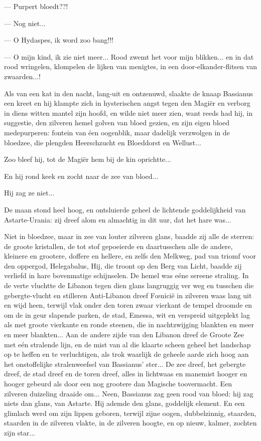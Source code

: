 \documentclass[a4paper, 12pt, oneside, dutch]{article}
\begin{document}
--- Purpert bloedt??!

--- Nog niet...

--- O Hydaspes, ik word zoo bang!!!

--- O mijn kind, ik zie niet meer... Rood zwemt het voor mijn blikken... en in dat rood wringelen, klompelen de lijken van menigtes, in een door-elkander-flitsen van zwaarden...!

Als van een kat in den nacht, lang-uit en ontzenuwd, slaakte de knaap Bassianus een kreet en hij klampte zich in hysterischen angst tegen den Magiër en verborg in diens witten mantel zijn hoofd, en wilde niet meer zien, want reeds had hij, in suggestie, den zilveren hemel golven van bloed gezien, en zijn eigen bloed medepurperen: fontein van éen oogenblik, maar dadelijk verzwolgen in de bloedzee, die plengden Heerschzucht en Bloeddorst en Wellust...

Zoo bleef hij, tot de Magiër hem bij de kin oprichtte...

En hij rond keek en zocht naar de zee van bloed...

Hij zag ze niet...

De maan stond heel hoog, en ontsluierde geheel de lichtende goddelijkheid van Astarte-Urania: zij dreef alom en almachtig in dit uur, dat het hare was...

Niet in bloedzee, maar in zee van louter zilveren glans, baadde zij alle de sterren: de groote kristallen, de tot stof gepoeierde en daartusschen alle de andere, kleinere en grootere, doffere en hellere, en zelfs den Melkweg, pad van triomf voor den oppergod, Helegabalus, Hij, die troont op den Berg van Licht, baadde zij verliefd in hare bovenmatige schijnselen. De hemel was eéne sereene straling. In de verte vluchtte de Libanon tegen dien glans langruggig ver weg en tusschen die gebergte-vlucht en stilleren Anti-Libanon dreef Fœnicië in zilveren waas lang uit en wijd heen, terwijl vlak onder den toren zwaar vierkant de tempel droomde en om de in geur slapende parken, de stad, Emessa, wit en verspreid uitgeplekt lag als met groote vierkante en ronde steenen, die in nachtzwijging blankten en meer en meer blankten... Aan de andere zijde van den Libanon dreef de Groote Zee met eén stralende lijn, en de mist van al die klaarte scheen geheel het landschap op te heffen en te verluchtigen, als trok waarlijk de geheele aarde zich hoog aan het onstoffelijke stralenweefsel van Bassianus' ster... De zee dreef, het gebergte dreef, de stad dreef en de toren dreef, alles in lichtwaas en manemist hooger en hooger gebeurd als door een nog grootere dan Magische toovermacht. Een zilveren duizeling draaide om... Neen, Bassianus zag geen rood van bloed: hij zag niets dan glans, van Astarte. Hij ademde den glans, goddelijk element. En een glimlach werd om zijn lippen geboren, terwijl zijne oogen, dubbelzinnig, staarden, staarden in de zilveren vlakte, in de zilveren hoogte, en op nieuw, kalmer, zochten zijn star...
\end{document}
